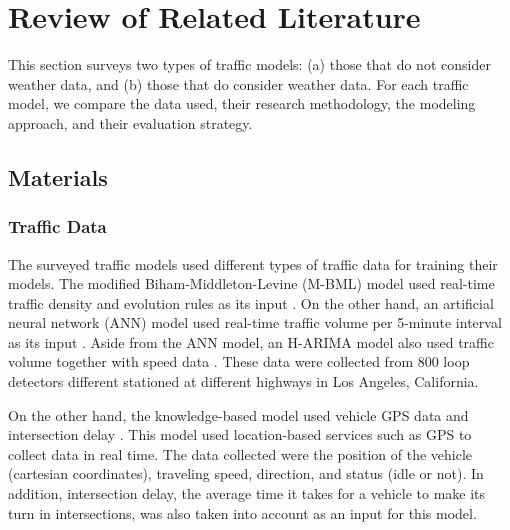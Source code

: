 %
%
%                 


\chapter{Review of Related Literature}
\label{sec:relatedlit}

This section surveys two types of traffic models: (a) those that do not consider weather data, and (b) those that do consider weather data. For each traffic model, we compare the data used, their research methodology, the modeling approach, and their evaluation strategy. 



\section{Materials}

\subsection{Traffic Data}
The surveyed traffic models used different types of traffic data for training their models. The modified Biham-Middleton-Levine (M-BML) model used real-time traffic density and evolution rules as its input . On the other hand, an artificial neural network (ANN) model used real-time traffic volume per 5-minute interval as its input . Aside from the ANN model, an H-ARIMA model also used traffic volume together with speed data . These data were collected from 800 loop detectors different stationed at different highways in Los Angeles, California.

On the other hand, the knowledge-based model used vehicle GPS data and intersection delay . This model used location-based services such as GPS to collect data in real time. The data collected were the position of the vehicle (cartesian coordinates), traveling speed, direction, and status (idle or not). In addition, intersection delay, the average time it takes for a vehicle to make its turn in intersections, was also taken into account as an input for this model.

